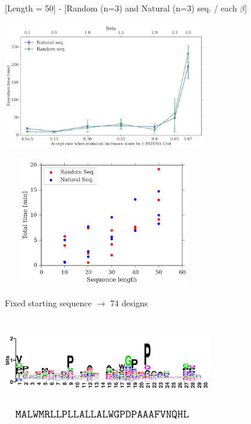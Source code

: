 \documentclass{beamer}
\begin{document}
\begin{frame}
\centering
[Length = 50] - [Random (n=3) and Natural (n=3) seq. / each $\beta$] \\
\begin{adjustwidth}{-1.5em}{-2.5em}
\includegraphics[width=330px,height=210px]{../img/betaVsTime.png} 
\end{adjustwidth}
\end{frame}


\begin{frame}
\centering
\begin{adjustwidth}{-1.5em}{-2.5em}
\includegraphics[width=330px,height=210px]{../img/lengthVsTime.png} 
\end{adjustwidth}
\end{frame}



\begin{frame}
\centering
Fixed starting sequence $\rightarrow$ 74 designs\\
\begin{adjustwidth}{-1.5em}{-2.5em}
\includegraphics[width=340px,height=150px]{../img/logo.png}\\ 
\vspace{10px}
\hspace{18px}\includegraphics[width=325px,height=15px]{../img/sequence.png}
\end{adjustwidth}
\end{frame}
\end{document}
